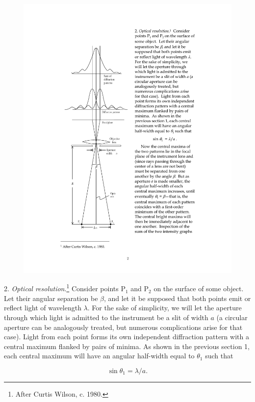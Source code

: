 \begin{figure}
\includegraphics[height=0.95\textheight]{images/10_heisenberg/Figure3SSD.pdf}
\end{figure}
2. \emph{Optical resolution}.\footnote{After Curtis Wilson, c. 1980.}
Consider points P$_1$ and P$_2$ on the surface of some object. Let their
angular separation be $\beta$, and let it be supposed that both points
emit or reflect light of wavelength $\lambda$. For the sake of
simplicity, we will let the aperture through which light is admitted to
the instrument be a slit of width $a$ (a circular aperture can be
analogously treated, but numerous complications arise for that case).
Light from each point forms its own independent diffraction pattern with
a central maximum flanked by pairs of minima. As shown in the previous
section 1, each central maximum will have an angular half-width equal to
$\theta_1$ such that

\begin{equation*}
\sin \theta_1 = \lambda/a.
\end{equation*}

